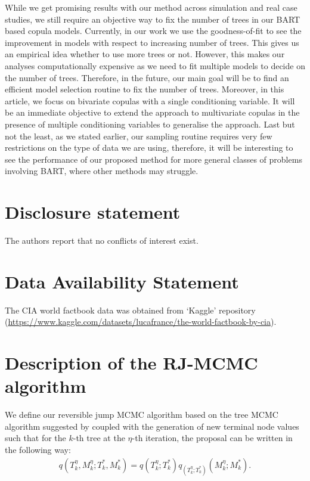\documentclass[
12pt]{article}
\begin{document}
	While we get promising results with our method across simulation and real case studies, we still require an objective way to fix the number of trees in our BART based copula models. Currently, in our work we use the goodness-of-fit to see the improvement in models with respect to increasing number of trees. This gives us an empirical idea whether to use more trees or not. However, this makes our analyses computationally expensive as we need to fit multiple models to decide on the number of trees. Therefore, in the future, our main goal will be to find an efficient model selection routine to fix the number of trees. Moreover, in this article, we focus on bivariate copulas with a single conditioning variable. It will be an immediate objective to extend the approach to multivariate copulas in the presence of multiple conditioning variables to generalise the approach. Last but not the least, as we stated earlier, our sampling routine requires very few restrictions on the type of data we are using, therefore, it will be interesting to see the performance of our proposed method for more general classes of problems involving BART, where other methods may struggle. 
	
	\section{Disclosure statement}\label{disclosure-statement}
	
	The authors report that no conflicts of interest exist.
	
	\section{Data Availability Statement}\label{data-availability-statement}
	
	The CIA world factbook data was obtained from `Kaggle' repository (\url{https://www.kaggle.com/datasets/lucafrance/the-world-factbook-by-cia}).
	
	
	
	\appendix
	
	\section{Description of the RJ-MCMC algorithm}\label{app:rj-mcmc}
	
	We define our reversible jump MCMC algorithm based on the tree MCMC algorithm suggested by \cite{chipman98BCART} coupled with the generation of new terminal node values such that for the $k$-th tree at the $\eta$-th iteration, the proposal can be written in the following way:
	\begin{align}\label{eq:prop}
		q\left(T_k^{\eta},M_k^{\eta};T_k^{\ast}, M_k^{\ast}\right) = q\left(T_k^{\eta};T_k^{\ast}\right) q_{\left(T_k^{\eta};T_k^{\ast}\right)}\left(M_k^{\eta};M_k^{\ast}\right).
	\end{align}
	
\end{document}
